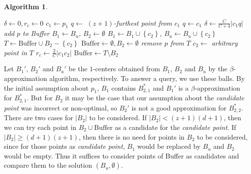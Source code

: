 \documentclass[envcountsame]{cls/cccg15}
\newtheorem{algorithm}{Algorithm}
\newcommand{\set}[1]{\left\{ #1 \right\}}
\newcommand{\card}[1]{\left|{#1}\right|}
\newcommand{\gee}{\geqslant}
\renewcommand{\ge}{\gee}
\begin{document}
\begin{algorithm}
\label{alg:case2}
\leavevmode
\begin{algorithmic}
\State $\delta \gets 0, r_c \gets 0$
\State $c_1 \gets p_1$
		\State $q \gets$  $(z+1)$-furthest point from $c_1$
	\Else
		\State $q \gets c_1$
	\EndIf
	\State $\delta \gets \frac{C}{C+4} \card{c_1q}$
		\State add $p$ to Buffer
		\While{$\card{\mbox{Buffer}} > z$}
			\If{$\card{B_2} \ge (d+1)(z+1)$}
				\State $B_1 \gets B_u$, $B_2 \gets \emptyset$
				\State $B_1 \gets B_1 \cup \set{c_2}$, $B_u \gets B_u \cup \set{c_2}$
			\EndIf
			\State $T \gets \mbox{Buffer} \cup B_2 - \set{c_2}$
			\State $\mbox{Buffer} \gets \emptyset, B_2 \gets \emptyset$
						\State remove $p$ from $T$
					\EndIf
				\EndFor
			\EndIf
			\State $c_2 \gets$ arbitrary point in $T$
			\State $r_c \gets \frac{2}{C}\card{c_1 c_2}$
				\State {}
			\EndFor				
			\State $\mbox{Buffer} \gets T \setminus B_2$
		\EndWhile
	\EndIf
\EndFor
\end{algorithmic}
\end{algorithm}

Let $B_1'$, $B_2'$ and $B_u'$ be the $1$-centers obtained from $B_1$, $B_2$ and $B_u$ by the $\beta$-approximation algorithm, respectively. To answer a query, we use these balls. By the initial assumption about $p_1$, $B_1$ contains $B_{2,1}^*$ and $B_1'$ is a $\beta$-approximation for $B_{2,1}^*$. But for $B_2$ it may be the case that our assumption about the \emph{candidate point} was incorrect or non-optimal, so $B_2'$ is not a good approximation for $B_{2,2}^*$. There are two cases for $\card{B_2}$ to be considered. If $\card{B_2} < (z+1)(d+1)$, then we can try each point in $B_2 \cup \mbox{Buffer}$ as a candidate for the \emph{candidate point}. If $\card{B_2} \ge (d+1)(z+1)$, then there is no need for points in $B_2$ to be considered, since for those points as \emph{candidate point}, $B_1$ would be replaced by $B_u$ and $B_2$ would be empty. Thus it suffices to consider points of Buffer as candidates and compare them to the solution $(B_u, \emptyset)$.
\end{document}
